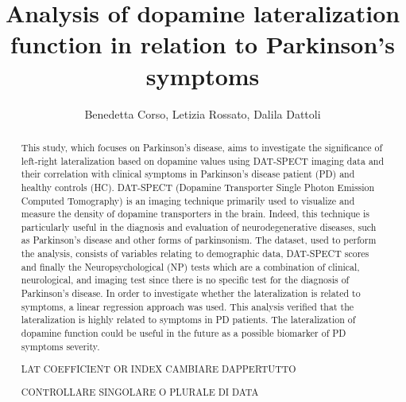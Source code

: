 \documentclass[]{article}
\title{Analysis of dopamine lateralization function in relation to Parkinson's symptoms}
\author{Benedetta Corso, Letizia Rossato, Dalila Dattoli}
\begin{document}
\maketitle

\begin{abstract}
This study, which focuses on Parkinson's disease, aims to investigate the significance of left-right lateralization based on dopamine values using DAT-SPECT imaging data and their correlation with clinical symptoms in Parkinson’s disease patient (PD) and healthy controls (HC). DAT-SPECT (Dopamine Transporter Single Photon Emission Computed Tomography) is an imaging technique primarily used to visualize and measure the density of dopamine transporters in the brain.  Indeed, this technique is particularly useful in the diagnosis and evaluation of neurodegenerative diseases, such as Parkinson's disease and other forms of parkinsonism. The dataset, used to perform the analysis, consists of variables relating to demographic data, DAT-SPECT scores and finally the Neuropsychological (NP) tests which are a combination of clinical, neurological, and imaging test since there is no specific test for the diagnosis of Parkinson’s disease. In order to investigate whether the lateralization is related to symptoms, a linear regression approach was used. This analysis verified that the lateralization is highly related to symptoms in PD patients.
The lateralization of dopamine function could be useful in the future as a possible biomarker of PD symptoms severity.

LAT COEFFICIENT OR INDEX CAMBIARE DAPPERTUTTO

CONTROLLARE SINGOLARE O PLURALE DI DATA
\newline

\end{abstract}
\end{document}
